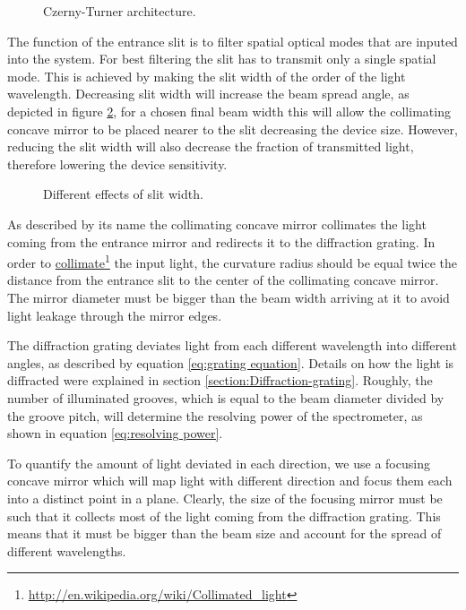 \documentclass[12pt,twoside,english]{book}
\renewcommand{\~}{\perispomeni}%
\numberwithin{equation}{section}
\numberwithin{figure}{section}
\newcommand\fnurl[2]{%
 \href{#2}{#1}\footnote{\url{#2}}%
}
\begin{document}
%
\begin{figure}[h]
\centering
\caption{Czerny-Turner architecture.}
\label{fig:Czerny-Turner-architecture}
\end{figure}

The function of the entrance slit is to filter spatial optical modes that are inputed into the system. For best filtering the slit has to transmit only a single spatial mode. This is achieved by making the slit width of the order of the light wavelength. Decreasing slit width will increase the beam spread angle, as depicted in figure \ref{fig:different slits}, for a chosen final beam width this will allow the collimating concave mirror to be placed nearer to the slit decreasing the device size. However, reducing the slit width will also decrease the fraction of transmitted light, therefore lowering the device sensitivity.

%
\begin{figure}[h]
\centering

\caption{Different effects of slit width.}
\label{fig:different slits}
\end{figure}

As described by its name the collimating concave mirror collimates the light coming from the entrance mirror and redirects it to the diffraction grating. In order to \fnurl{collimate}{http://en.wikipedia.org/wiki/Collimated_light} the input light, the curvature radius should be equal twice the distance from the entrance slit to the center of the collimating concave mirror. The mirror diameter must be bigger than the beam width arriving at it to avoid light leakage through the mirror edges.

The diffraction grating deviates light from each different wavelength into different angles, as described by equation \ref{eq:grating equation}. Details on how the light is diffracted were explained in section \ref{section:Diffraction-grating}. Roughly, the number of illuminated grooves, which is equal to the beam diameter divided by the groove pitch, will determine the resolving power of the spectrometer, as shown in equation \ref{eq:resolving power}.

To quantify the amount of light deviated in each direction, we use a focusing concave mirror which will map light with different direction and focus them each into a distinct point in a plane. Clearly, the size of the focusing mirror must be such that it collects most of the light coming from the diffraction grating. This means that it must be bigger than the beam size and account for the spread of different wavelengths.
\end{document}
